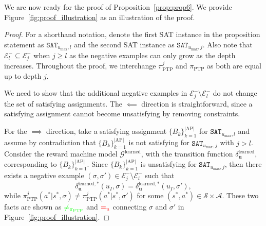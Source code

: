 \documentclass[letterpaper, 10 pt, conference]{ieeeconf}
\newcommand{\ptp}{\pi_{\mathrm{PTP}}}
\begin{document}
 We are now ready for the proof of Proposition~\ref{prop:prop6}. We provide Figure~\ref{fig:proof_illustration} as an illustration of the proof. 

\begin{proof}
    For a shorthand notation, denote the first SAT instance in the proposition statement as $\texttt{SAT}_{{u_{\mathrm{max}}},l}$ and the second SAT instance as $\texttt{SAT}_{{u_{\mathrm{max}}},j}$. Also note that $\mathcal{E}^{-}_l \subseteq \mathcal{E}^{-}_j$ when $j\geq l$ as the negative examples can only grow as the depth increases. Throughout the proof, we interchange $\ptp^j$ and $\ptp$ as both are equal up to depth $j$. 

We need to show that the additional negative examples in $\mathcal{E}^{-}_j \setminus \mathcal{E}^{-}_l $ do not change the set of satisfying assignments. The $\impliedby$ direction is straightforward, since a satisfying assignment cannot become unsatisfying by removing constraints. 

For the $\implies$ direction, take a satisfying assignment $\{B_k\}_{k=1}^{|\mathrm{AP}|}$ for
$\texttt{SAT}_{{u_{\mathrm{max}}},l}$ and assume by contradiction that $\{B_k\}_{k=1}^{|\mathrm{AP}|}$ is not satisfying for $\texttt{SAT}_{{u_{\mathrm{max}}},j}$ with $j>l$. Consider the reward machine model $\mathcal{G}^{\mathrm{learned}}$, with the transition function $\delta_{\textbf{u}}^{\mathrm{learned}}$, corresponding to $\{B_k\}_{k=1}^{|\mathrm{AP}|}$. Since $\{B_k\}_{k=1}^{|\mathrm{AP}|}$ is unsatisfying for $\texttt{SAT}_{{u_{\mathrm{max}}},j}$, then there exists a negative example $(\sigma, \sigma')\in \mathcal{E}^{-}_j \setminus \mathcal{E}^{-}_l$ such that
\begin{equation}\label{eq:contra_assump}
 \delta_{\textbf{u}}^{\mathrm{learned},*}(u_I,\sigma) = \delta_{\textbf{u}}^{\mathrm{learned},*}(u_I,\sigma'),   
\end{equation}
while $\ptp^j(a^*|s^*,\sigma) \neq \ptp^j(a^*|s^*,\sigma')$ for some $(s^*,a^*) \in \mathcal{S}\times \mathcal{A}$. These two facts are shown as ${\color{green} \neq_{\ptp}}$ and ${\color{red}=_u}$ connecting $\sigma$ and $\sigma'$ in Figure~\ref{fig:proof_illustration}. 


\end{proof}
\end{document}
